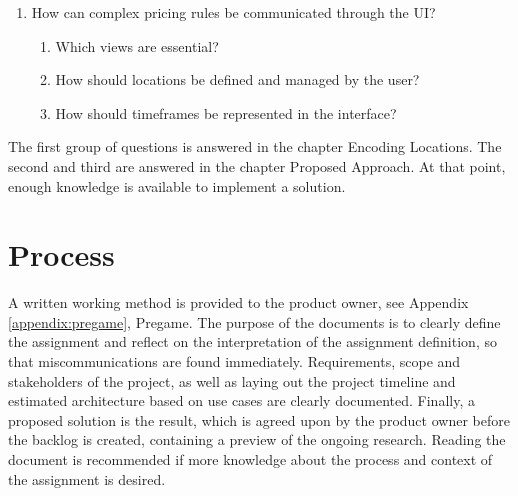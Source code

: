 \begin{enumerate}
	\item How can complex pricing rules be communicated through the UI?
		\begin{enumerate}[label*=\arabic*.]
			\item Which views are essential?
			\item How should locations be defined and managed by the user?
			\item How should timeframes be represented in the interface?
		\end{enumerate}

\end{enumerate}

The first group of questions is answered in the chapter Encoding Locations. The second and third are answered in the chapter Proposed Approach. At that point, enough knowledge is available to implement a solution.

%
\section{Process}
A written working method is provided to the product owner, see Appendix \ref{appendix:pregame}, Pregame. The purpose of the documents is to clearly define the assignment and reflect on the interpretation of the assignment definition, so that miscommunications are found immediately. Requirements, scope and stakeholders of the project, as well as laying out the project timeline and estimated architecture based on use cases are clearly documented. Finally, a proposed solution is the result, which is agreed upon by the product owner before the backlog is created, containing a preview of the ongoing research. Reading the document is recommended if more knowledge about the process and context of the assignment is desired.
